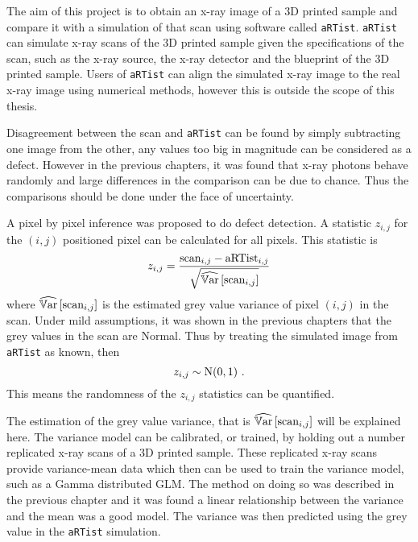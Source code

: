 The aim of this project is to obtain an x-ray image of a 3D printed sample and compare it with a simulation of that scan using software called \texttt{aRTist}. \texttt{aRTist} can simulate x-ray scans of the 3D printed sample given the specifications of the scan, such as the x-ray source, the x-ray detector and the blueprint of the 3D printed sample. Users of \texttt{aRTist} can align the simulated x-ray image to the real x-ray image using numerical methods, however this is outside the scope of this thesis.

Disagreement between the scan and \texttt{aRTist} can be found by simply subtracting one image from the other, any values too big in magnitude can be considered as a defect. However in the previous chapters, it was found that x-ray photons behave randomly and large differences in the comparison can be due to chance. Thus the comparisons should be done under the face of uncertainty.

A pixel by pixel inference was proposed to do defect detection. A statistic $z_{i,j}$ for the $(i,j)$ positioned pixel can be calculated for all pixels. This statistic is
\begin{equation}
    z_{i,j} = 
    \dfrac{
        \text{scan}_{i,j} - \text{aRTist}_{i,j}
    }
    {
        \sqrt{\widehat{\operatorname{\mathbb{V}ar}}\left[\text{scan}_{i,j}\right]}
    }
\end{equation}
where $\widehat{\operatorname{\mathbb{V}ar}}\left[\text{scan}_{i,j}\right]$ is the estimated grey value variance of pixel $(i,j)$ in the scan. Under mild assumptions, it was shown in the previous chapters that the grey values in the scan are Normal. Thus by treating the simulated image from \texttt{aRTist} as known, then
\begin{equation}
z_{i,j}\sim \operatorname{N}(0,1) \ .
\end{equation}
This means the randomness of the $z_{i,j}$ statistics can be quantified.

The estimation of the grey value variance, that is $\widehat{\operatorname{\mathbb{V}ar}}\left[\text{scan}_{i,j}\right]$ will be explained here. The variance model can be calibrated, or trained, by holding out a number replicated x-ray scans of a 3D printed sample. These replicated x-ray scans provide variance-mean data which then can be used to train the variance model, such as a Gamma distributed GLM. The method on doing so was described in the previous chapter and it was found a linear relationship between the variance and the mean was a good model. The variance was then predicted using the grey value in the \texttt{aRTist} simulation.

